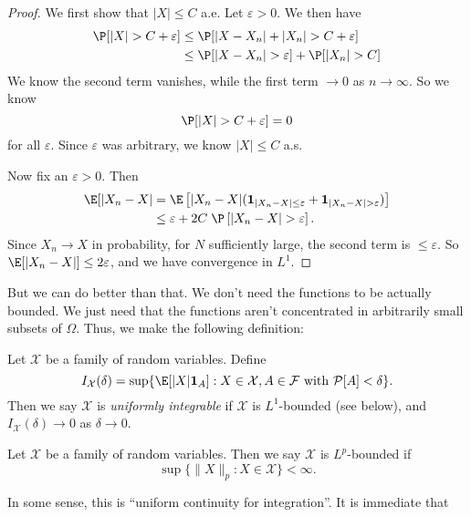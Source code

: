 \documentclass[a4paper]{article}
\begin{document}
\begin{proof}
  We first show that $|X| \leq C$ a.e. Let $\varepsilon > 0$. We then have
  \begin{align*}
    \P[|X| > C+ \varepsilon] &\leq \P[|X - X_n| + |X_n| > C + \varepsilon]\\
    &\leq \P[|X - X_n|> \varepsilon] + \P[|X_n| > C]
  \end{align*}
  We know the second term vanishes, while the first term $\to 0$ as $n \to \infty$. So we know
  \[
    \P[|X| > C + \varepsilon] = 0
  \]
  for all $\varepsilon$. Since $\varepsilon$ was arbitrary, we know $|X| \leq C$ a.s.

  Now fix an $\varepsilon > 0$. Then
  \begin{align*}
    \E[|X_n - X| &= \E\left[ |X_n - X| (\mathbf{1}_{|X_n - X| \leq \varepsilon} + \mathbf{1}_{|X_n - X| > \varepsilon})\right] \\
    &\leq \varepsilon + 2C\; \P\left[|X_n - X| > \varepsilon\right].
  \end{align*}
  Since $X_n \to X$ in probability, for $N$ sufficiently large, the second term is $\leq \varepsilon$. So $\E[|X_n - X|] \leq 2 \varepsilon$, and we have convergence in $L^1$.
\end{proof}

But we can do better than that. We don't need the functions to be actually bounded. We just need that the functions aren't concentrated in arbitrarily small subsets of $\Omega$. Thus, we make the following definition:

\begin{defi}
  Let $\mathcal{X}$ be a family of random variables. Define
  \[
    I_\mathcal{X}(\delta) = \sup\{\E[|X|\mathbf{1}_A]: X \in \mathcal{X}, A \in \mathcal{F} \text{ with }\mathcal{P}[A] < \delta\}.
  \]
  Then we say $\mathcal{X}$ is \emph{uniformly integrable} if $\mathcal{X}$ is $L^1$-bounded (see below), and $I_\mathcal{X}(\delta) \to 0$ as $\delta \to 0$.
\end{defi}

\begin{defi}[$L^p$-bounded]
  Let $\mathcal{X}$ be a family of random variables. Then we say $\mathcal{X}$ is $L^p$-bounded if
  \[
    \sup\{\|X\|_p: X \in \mathcal{X}\} < \infty.
  \]
\end{defi}

In some sense, this is ``uniform continuity for integration''. It is immediate that
\end{document}
